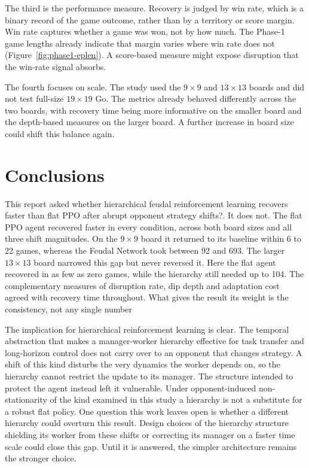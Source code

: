 \documentclass[sigconf,nonacm]{acmart}
\begin{document}
The third is the performance measure. Recovery is judged by win rate, which is a binary record of the game outcome, rather than by a territory or score margin. Win rate captures whether a game was won, not by how much. The Phase-1 game lengths already indicate that margin varies where win rate does not (Figure~\ref{fig:phase1-eplen}). A score-based measure might expose disruption that the win-rate signal absorbs.

The fourth focuses on scale. The study used the $9\times9$ and $13\times13$ boards and did not test full-size $19\times19$ Go. The metrics already behaved differently across the two boards, with recovery time being more informative on the smaller board and the depth-based measures on the larger board. A further increase in board size could shift this balance again.

\section{Conclusions}

This report asked whether hierarchical feudal reinforcement learning recovers faster than flat PPO after abrupt opponent strategy shifts?. It does not. The flat PPO agent recovered faster in every condition, across both board sizes and all three shift magnitudes. On the $9\times9$ board it returned to its baseline within 6 to 22 games, whereas the Feudal Network took between 92 and 693. The larger $13\times13$ board narrowed this gap but never reversed it. Here the flat agent recovered in as few as zero games, while the hierarchy still needed up to 104. The complementary measures of disruption rate, dip depth and adaptation cost agreed with recovery time throughout. What gives the result its weight is the consistency, not any single number

The implication for hierarchical reinforcement learning is clear. The temporal abstraction that makes a manager-worker hierarchy effective for task transfer and long-horizon control does not carry over to an opponent that changes strategy. A shift of this kind disturbs the very dynamics the worker depends on, so the hierarchy cannot restrict the update to its manager. The structure intended to protect the agent instead left it vulnerable. Under opponent-induced non-stationarity of the kind examined in this study a hierarchy is not a substitute for a robust flat policy. One question this work leaves open is whether a different hierarchy could overturn this result. Design choices of the hierarchy structure shielding its worker from these shifts or correcting its manager on a faster time scale could close this gap. Until it is answered, the simpler architecture remains the stronger choice.
\end{document}
